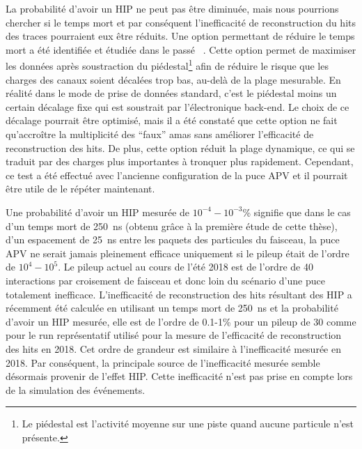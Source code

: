 La probabilité d'avoir un HIP ne peut pas être diminuée, mais nous pourrions chercher si le temps mort et par conséquent l’inefficacité de reconstruction du hits des traces pourraient eux être réduits. Une option permettant de réduire le temps mort a été identifiée et étudiée dans le passé ~\cite{website:hitLoss}. Cette option permet de maximiser les données après soustraction du piédestal\footnote{Le piédestal est l’activité moyenne sur une piste quand aucune particule n’est présente.} afin de réduire le risque que les charges des canaux soient décalées trop bas, au-delà de la plage mesurable. En réalité dans le mode de prise de données standard, c'est le piédestal moins un certain décalage fixe qui est soustrait par l’électronique back-end. Le choix de ce décalage pourrait être optimisé, mais il a été constaté que cette option ne fait qu’accroître la multiplicité des ``faux'' amas  sans améliorer l’efficacité de reconstruction des hits. De plus, cette option réduit la plage dynamique, ce qui se traduit par des charges plus importantes à tronquer plus rapidement. Cependant, ce test a été effectué avec l'ancienne configuration de la puce APV et il pourrait être utile de le répéter maintenant.



Une probabilité d'avoir un HIP mesurée de $10^{-4}-10^{-3}$\% signifie que dans le cas d'un temps mort de 250~ns (obtenu grâce à la première étude de cette thèse), d'un espacement de 25~ns entre les paquets des particules du faisceau, la puce APV ne serait jamais pleinement efficace uniquement si le pileup était de l'ordre de $10^4 - 10^5$. Le pileup actuel au cours de l'été 2018 est de l'ordre de 40 interactions par croisement de faisceau et donc loin du scénario d'une puce totalement inefficace. L'inefficacité de reconstruction des hits résultant des HIP a récemment été calculée en utilisant un temps mort de 250~ns et la probabilité d'avoir un HIP mesurée, elle est de l'ordre de 0.1-1\% pour un pileup de 30 comme pour le run représentatif utilisé pour la mesure de l'efficacité de reconstruction des hits en 2018. Cet ordre de grandeur est similaire à l'inefficacité mesurée en 2018. Par conséquent, la principale source de l’inefficacité mesurée semble désormais provenir de l’effet HIP. Cette inefficacité n'est pas prise en compte lors de la simulation des événements.


